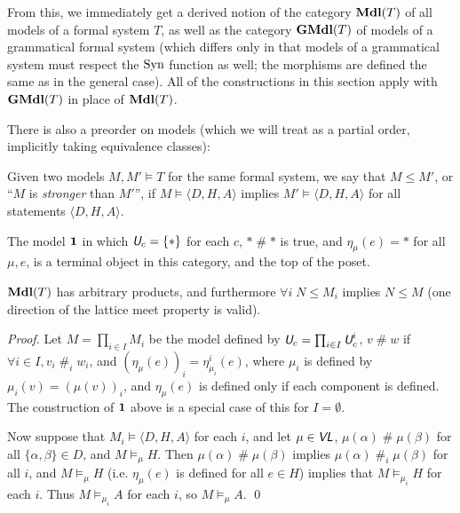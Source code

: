 \documentclass[runningheads,a4paper]{llncs}
\newcommand{\vl}{\textit{\textsf{VL}}} %
\newcommand{\uv}{\textit{\textsf{U}}} %
\newcommand{\ang}[1]{\langle#1\rangle}
\newcommand{\syn}{{\rm Syn}}
\newcommand{\fresh}{\mathbin{\#}}
\begin{document}
From this, we immediately get a derived notion of the category ${\bf Mdl}(T)$ of all models of a formal system $T$, as well as the category ${\bf GMdl}(T)$ of models of a grammatical formal system (which differs only in that models of a grammatical system must respect the $\syn$ function as well; the morphisms are defined the same as in the general case). All of the constructions in this section apply with ${\bf GMdl}(T)$ in place of ${\bf Mdl}(T)$.

There is also a preorder on models (which we will treat as a partial order, implicitly taking equivalence classes):
\begin{definition}
Given two models $M,M'\models T$ for the same formal system, we say that $M\le M'$, or ``$M$ is {\em stronger} than $M'$'', if $M\models\ang{D,H,A}$ implies $M'\models\ang{D,H,A}$ for all statements $\ang{D,H,A}$.
\end{definition}

The model $\bf 1$ in which $\uv_c=\{\ast\}$ for each $c$, $\ast\fresh\ast$ is true, and $\eta_\mu(e)=\ast$ for all $\mu,e$, is a terminal object in this category, and the top of the poset.

\begin{theorem}
${\bf Mdl}(T)$ has arbitrary products, and furthermore $\forall i\;N\le M_i$ implies $N\le M$ (one direction of the lattice meet property is valid).
\end{theorem}
\begin{proof}
Let $M=\prod_{i\in I}M_i$ be the model defined by $\uv_c=\prod_{i\in I}\uv^i_c$, $v\fresh w$ if $\forall i\in I,v_i\fresh_iw_i$, and $(\eta_\mu(e))_i=\eta^i_{\mu_i}(e)$, where $\mu_i$ is defined by $\mu_i(v)=(\mu(v))_i$, and $\eta_\mu(e)$ is defined only if each component is defined. The construction of $\bf 1$ above is a special case of this for $I=\emptyset$.

Now suppose that $M_i\models\ang{D,H,A}$ for each $i$, and let $\mu\in\vl$, $\mu(\alpha)\fresh\mu(\beta)$ for all $\{\alpha,\beta\}\in D$, and $M\models_\mu H$. Then $\mu(\alpha)\fresh\mu(\beta)$ implies $\mu(\alpha)\fresh_i\mu(\beta)$ for all $i$, and $M\models_\mu H$ (i.e. $\eta_\mu(e)$ is defined for all $e\in H$) implies that $M\models_{\mu_i} H$ for each $i$. Thus $M\models_{\mu_i} A$ for each $i$, so $M\models_\mu A$.
\qed\end{proof}
\end{document}
